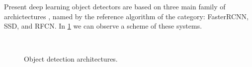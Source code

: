 \documentclass[12pt, a4paper, titlepage,twoside,openright]{article}
\begin{document}


Present deep learning object detectors are based on three main family of archictectures \cite{cnnComparision}, named by the reference algorithm of the category: FasterRCNN, SSD, and RFCN. In \ref{refArchite} we can observe a scheme of these systems.

\begin{figure}[H]
		
\centering

\\

\caption{Object detection architectures.}
\label{refArchite}
\end{figure}
\end{document}
